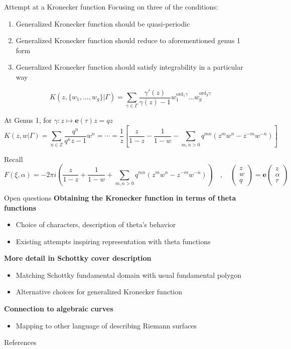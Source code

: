 \documentclass[11pt,aspectratio=169]{beamer}
\newcommand{\ee}[0]{\mathbf{e}}
\begin{document}
\begin{frame}{Attempt at a Kronecker function}{\tiny \cite{Cha22}}
    Focusing on three of the conditions:
    \begin{enumerate}
        \item Generalized Kronecker function should be quasi-periodic
        \item Generalized Kronecker function should reduce to aforementioned genus 1 form
        \item Generalized Kronecker function should satisfy integrability in a particular way
    \end{enumerate}

    \pause{}

    \[K(z,\{w_1,...,w_g\}|\Gamma) = \sum_{\gamma \in \Gamma} \frac{\gamma'(z)}{\gamma(z)-1} w_1^{\mathrm{ord}_1\gamma}...w_g^{\mathrm{ord}_g\gamma}\]
    
    \pause{}

    At Genus 1, for $\gamma : z \mapsto \ee(\tau) z = qz$
    \[K(z,w|\Gamma) = \sum_{n \in \mathbb Z} \frac{q^n}{q^n z - 1} w^n = \cdots = \frac{1}{z} \left[\frac{z}{1-z} - \frac{1}{1-w} - \sum_{m,n > 0} q^{mn} (z^m w^n - z^{-m} w^{-n})\right]\]
    
    \pause{}
    
    Recall
    \[F(\xi,\alpha) = -2\pi i \left(\frac{z}{1-z} + \frac{1}{1-w} + \sum_{m,n > 0} q^{mn}(z^m w^n - z^{-m} w^{-n}) \right) \quad , \quad \begin{pmatrix} z \\ w \\ q \end{pmatrix} = \ee \begin{pmatrix}z \\ \alpha \\ \tau\end{pmatrix}\]
\end{frame}

\begin{frame}{Open questions}
    \textbf{Obtaining the Kronecker function in terms of theta functions}
    \begin{itemize}
        \item Choice of characters, description of theta's behavior
        \item Existing attempts inspiring representation with theta functions
    \end{itemize}

    \textbf{More detail in Schottky cover description}
    \begin{itemize}
        \item Matching Schottky fundamental domain with usual fundamental polygon
        \item Alternative choices for generalized Kronecker function
    \end{itemize}

    \textbf{Connection to algebraic curves}
    \begin{itemize}
        \item Mapping to other language of describing Riemann surfaces
    \end{itemize}
\end{frame}

\begin{frame}{References}
    \printbibliography{}
\end{frame}
\end{document}
